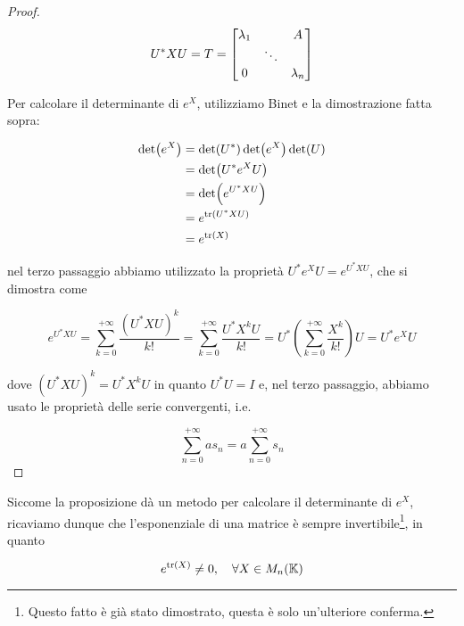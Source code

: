 \begin{proof}
	\begin{equation}
		U^{*} X U = T = %
		\bmqty{ %
				\lambda_{1} & & A \\
				& \ddots & \\
				0 & & \lambda_{n} %
				}
	\end{equation}
	
	Per calcolare il determinante di $ e^{X} $, utilizziamo Binet e la dimostrazione fatta sopra:

	\begin{align}
		\begin{split}
			\det(e^{X}) &= \det(U^{*}) \det(e^{X}) \det(U) \\
			&= \det(U^{*} e^{X} U) \\
			&= \det(e^{U^{*} X U}) \\
			&= e^{\tr(U^{*} X U)} \\
			&= e^{\tr(X)}
		\end{split}
	\end{align}
	
	nel terzo passaggio abbiamo utilizzato la proprietà $ U^{*} e^{X} U = e^{U^{*} X U} $, che si dimostra come
	
	\begin{equation}
		e^{U^{*} X U} %
		= \sum_{k=0}^{+\infty} \dfrac{(U^{*} X U)^{k}}{k!} %
		= \sum_{k=0}^{+\infty} \dfrac{U^{*} X^{k} U}{k!} %
		= U^{*} \left( \sum_{k=0}^{+\infty} \dfrac{X^{k}}{k!} \right) U %
		= U^{*} e^{X} U
	\end{equation}

	dove $ (U^{*} X U)^{k} = U^{*} X^{k} U $ in quanto $ U^{*} U = I $ e, nel terzo passaggio, abbiamo usato le proprietà delle serie convergenti, i.e.
	
	\begin{equation}
		\sum_{n=0}^{+\infty} a s_{n} = a \sum_{n=0}^{+\infty} s_{n}
	\end{equation}
\end{proof}

\begin{corollary}
	Siccome la proposizione dà un metodo per calcolare il determinante di $ e^{X} $, ricaviamo dunque che l'esponenziale di una matrice è sempre invertibile\footnote{%
		Questo fatto è già stato dimostrato, questa è solo un'ulteriore conferma.%
	}, in quanto

	\begin{equation}
		e^{\tr(X)} \neq 0 \qcomma \forall X \in M_{n}(\K)
	\end{equation}
\end{corollary}

